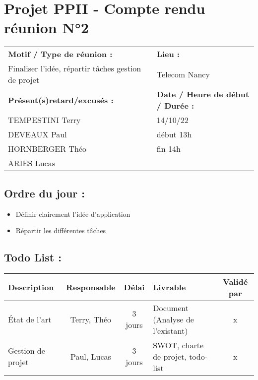 \documentclass{report}
\begin{document}
\newpage

\section*{Projet PPII - Compte rendu réunion N°2}
\begin{tabular}{|p{7cm}|p{6cm}|}
    \hline
    \textbf{Motif / Type de réunion :}
    & \textbf{Lieu :}
    \\
    Finaliser l’idée, répartir tâches gestion de projet 
    & 
    Telecom Nancy
    \\ \hline
    \textbf{Présent(s)retard/excusés :}
    &
    \textbf{Date / Heure de début / Durée :}
    \\ 
    TEMPESTINI Terry &  14/10/22\\  
    DEVEAUX Paul & début 13h\\
    HORNBERGER Théo & fin 14h\\
    ARIES Lucas & 
    \\ \hline
\end{tabular}

\subsection*{Ordre du jour :}
\begin{itemize}
    \item{Définir clairement l’idée d’application}
    \item{Répartir les différentes tâches}
\end{itemize}

\subsection*{Todo List :}
\begin{tabular}{|p{3.5cm}|c|c|p{4.5cm}|c|}
    \hline 
    Description & Responsable & Délai & Livrable & Validé par 
    \\ \hline
    État de l’art & Terry, Théo & 3 jours &Document (Analyse de l’existant) & x
    \\ \hline
    Gestion de projet & Paul, Lucas & 3 jours & SWOT, charte de projet, todo-list & x
    \\ \hline
\end{tabular}


\newpage
\end{document}
